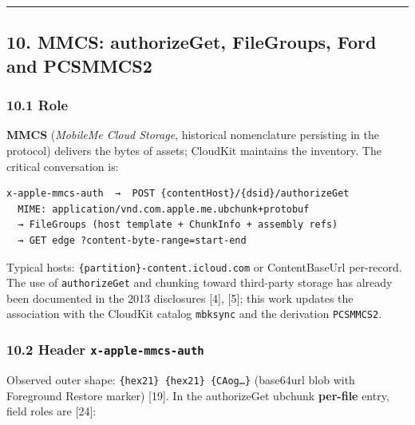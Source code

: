 \documentclass[
  english,
  10pt]{article}
\begin{document}
\begin{center}\rule{0.5\linewidth}{0.5pt}\end{center}

\subsection{10. MMCS: authorizeGet, FileGroups, Ford and
PCSMMCS2}\label{mmcs-authorizeget-filegroups-ford-and-pcsmmcs2}

\subsubsection{10.1 Role}\label{role}

\textbf{MMCS} (\emph{MobileMe Cloud Storage}, historical nomenclature
persisting in the protocol) delivers the bytes of assets; CloudKit
maintains the inventory. The critical conversation is:

\begin{verbatim}
x-apple-mmcs-auth  →  POST {contentHost}/{dsid}/authorizeGet
  MIME: application/vnd.com.apple.me.ubchunk+protobuf
  → FileGroups (host template + ChunkInfo + assembly refs)
  → GET edge ?content-byte-range=start-end
\end{verbatim}

Typical hosts: \texttt{\{partition\}-content.icloud.com} or
ContentBaseUrl per-record. The use of \texttt{authorizeGet} and chunking
toward third-party storage has already been documented in the 2013
disclosures {[}4{]}, {[}5{]}; this work updates the association with the
CloudKit catalog \texttt{mbksync} and the derivation \texttt{PCSMMCS2}.

\subsubsection{\texorpdfstring{10.2 Header
\texttt{x-apple-mmcs-auth}}{10.2 Header x-apple-mmcs-auth}}\label{header-x-apple-mmcs-auth}

Observed outer shape: \texttt{\{hex21\}\ \{hex21\}\ \{CAog…\}}
(base64url blob with Foreground Restore marker) {[}19{]}. In the
authorizeGet ubchunk \textbf{per-file} entry, field roles are {[}24{]}:
\end{document}
